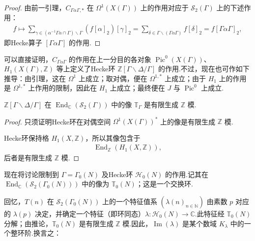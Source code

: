\begin{proof}

由前一引理，$C_{\Gamma\alpha\Gamma,*}$ 在 $\Omega^1(X(\Gamma))$ 上的作用对应于 $\mathcal S_2(\Gamma)$ 上的下述作用：
\begin{align*}
f\longmapsto\sum_{\gamma\in(\alpha^{-1}\Gamma\alpha\cap\Gamma)\backslash\Gamma}(f[\alpha]_2)[\gamma]_2
=\sum_{\delta\in\Gamma\backslash(\Gamma\alpha\Gamma)}f[\delta]_2
=f[\Gamma\alpha\Gamma]_2,
\end{align*}
即Hecke算子 $[\Gamma\alpha\Gamma]$ 的作用.

\end{proof}

可以直接证明，$C_{\Gamma\alpha\Gamma}$ 的作用在上一分目的各对象 $\operatorname{Pic}^0(X(\Gamma))$、$H_1(X(\Gamma),\mathbb Z)$ 等上定义了Hecke环 $\mathbb Z[\Gamma\backslash\Delta/\Gamma]$ 的作用.不过，现在也可作如下推导：由引理，这在 $\Omega^1$ 上成立；取对偶，便在 $\Omega^{1,*}$ 上成立；由于 $H_1$ 上的作用是 $\Omega^{1,*}$ 上作用的限制，因此在 $H_1$ 上成立；最终便在 $J$ 与 $\operatorname{Pic}^0$ 上成立.

\begin{corollary*}

$\mathbb Z[\Gamma\backslash\Delta/\Gamma]$ 在 $\operatorname{End}_{\mathbb C}(\mathcal S_2(\Gamma))$ 中的像 $\mathbb T_\Gamma$ 是有限生成 $\mathbb Z$ 模.

\end{corollary*}

\begin{proof}

只须证明Hecke环在对偶空间 $\Omega^1(X(\Gamma))^*$ 上的像是有限生成 $\mathbb Z$ 模.



Hecke环保持格 $H_1(X,\mathbb Z)$，所以其像包含于
\begin{align*}
\operatorname{End}_{\mathbb Z}(H_1(X,\mathbb Z)),
\end{align*}
后者是有限生成 $\mathbb Z$ 模.

\end{proof}

现在将讨论限制到 $\Gamma=\Gamma_0(N)$ 及Hecke环 $\mathcal H_0(N)$ 的作用.记其在 $\operatorname{End}_{\mathbb C}(\mathcal S_2(\Gamma_0(N)))$ 中的像为 $\mathbb T_0(N)$；这是一个交换环.



回忆，$T(n)$ 在 $\mathcal S_2(\Gamma_0(N))$ 上的一个特征值系 $(\lambda(n)_{n\in\mathbb N})$ 由素数 $p$ 对应的 $\lambda(p)$ 决定，并确定一个特征（即环同态）$\lambda:\mathcal H_0(N)\longrightarrow\mathbb C$.此特征经 $\mathbb T_0(N)$ 分解；由推论，$\mathbb T_0(N)$ 是有限生成 $\mathbb Z$ 模.因此，$\operatorname{Im}(\lambda)$ 是某个数域 $K_\lambda$ 中的一个整环阶.换言之：

